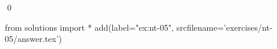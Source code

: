 
\begin{ex} 
  \label{ex:nt-05}
  
  \qed
\end{ex} 
\begin{python0}
from solutions import *
add(label="ex:nt-05",
    srcfilename='exercises/nt-05/answer.tex') 
\end{python0}

